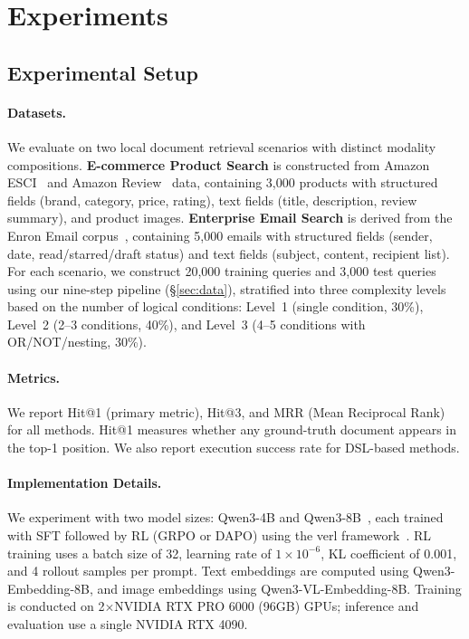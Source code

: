 
\section{Experiments}
\label{sec:experiments}

\subsection{Experimental Setup}
\label{sec:setup}

\paragraph{Datasets.}
We evaluate on two local document retrieval scenarios with distinct modality compositions.
\textbf{E-commerce Product Search} is constructed from Amazon ESCI~\cite{reddy2022shopping} and Amazon Review~\cite{ni2019justifying} data, containing 3{,}000 products with structured fields (brand, category, price, rating), text fields (title, description, review summary), and product images.
\textbf{Enterprise Email Search} is derived from the Enron Email corpus~\cite{klimt2004enron}, containing 5{,}000 emails with structured fields (sender, date, read/starred/draft status) and text fields (subject, content, recipient list).
For each scenario, we construct 20{,}000 training queries and 3{,}000 test queries using our nine-step pipeline (\S\ref{sec:data}), stratified into three complexity levels based on the number of logical conditions: Level~1 (single condition, 30\%), Level~2 (2--3 conditions, 40\%), and Level~3 (4--5 conditions with OR/NOT/nesting, 30\%).

\paragraph{Metrics.}
We report Hit@1 (primary metric), Hit@3, and MRR (Mean Reciprocal Rank) for all methods. Hit@1 measures whether any ground-truth document appears in the top-1 position. We also report execution success rate for DSL-based methods.

\paragraph{Implementation Details.}
We experiment with two model sizes: Qwen3-4B and Qwen3-8B~\cite{yang2025qwen3}, each trained with SFT followed by RL (GRPO or DAPO) using the verl framework~\cite{sheng2024hybridflow}.
RL training uses a batch size of 32, learning rate of $1 \times 10^{-6}$, KL coefficient of 0.001, and 4 rollout samples per prompt.
Text embeddings are computed using Qwen3-Embedding-8B, and image embeddings using Qwen3-VL-Embedding-8B.
Training is conducted on 2$\times$NVIDIA RTX PRO 6000 (96GB) GPUs; inference and evaluation use a single NVIDIA RTX 4090.

